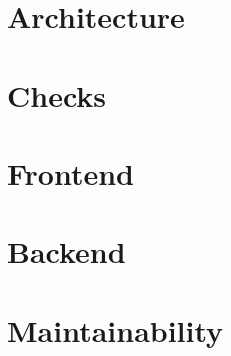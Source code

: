 
\chapter{Architecture}


\chapter{Checks}


\chapter{Frontend}


\chapter{Backend}


\chapter{Maintainability}


